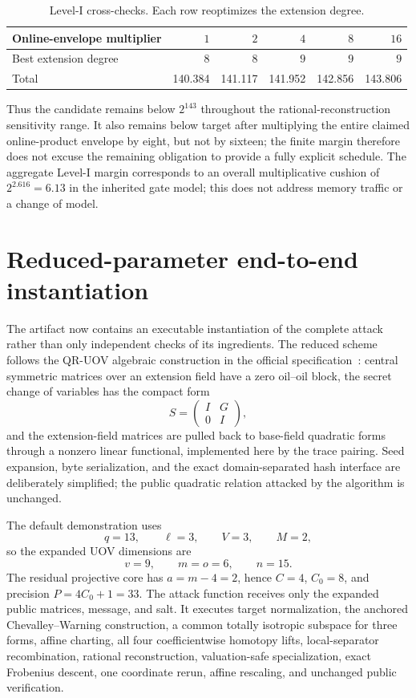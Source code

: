 \documentclass[11pt,a4paper]{article}
\theoremstyle{definition}
\theoremstyle{remark}
\begin{document}
\begin{table}[ht]
\centering
\caption{Level-I cross-checks.  Each row reoptimizes the extension degree.}
\label{tab:robustness}
\begin{tabular}{@{}lrrrrr@{}}
\toprule
Online-envelope multiplier & $1$ & $2$ & $4$ & $8$ & $16$\\
\midrule
Best extension degree & $8$ & $8$ & $9$ & $9$ & $9$\\
Total & 140.384 & 141.117 & 141.952 & 142.856 & 143.806\\
\bottomrule
\end{tabular}
\end{table}

Thus the candidate remains below $2^{143}$ throughout the rational-reconstruction sensitivity range.  It also remains below target after multiplying the entire claimed online-product envelope by eight, but not by sixteen; the finite margin therefore does not excuse the remaining obligation to provide a fully explicit schedule.  The aggregate Level-I margin corresponds to an overall multiplicative cushion of $2^{2.616}=6.13$ in the inherited gate model; this does not address memory traffic or a change of model.


\section{Reduced-parameter end-to-end instantiation}\label{sec:implementation}

The artifact now contains an executable instantiation of the complete attack rather than only independent checks of its ingredients.  The reduced scheme follows the QR-UOV algebraic construction in the official specification~\cite{QRUOVSpec}: central symmetric matrices over an extension field have a zero oil--oil block, the secret change of variables has the compact form
\[
 S=\begin{pmatrix}I&G\\0&I\end{pmatrix},
\]
and the extension-field matrices are pulled back to base-field quadratic forms through a nonzero linear functional, implemented here by the trace pairing.  Seed expansion, byte serialization, and the exact domain-separated hash interface are deliberately simplified; the public quadratic relation attacked by the algorithm is unchanged.

The default demonstration uses
\[
 q=13,\qquad \ell=3,\qquad V=3,\qquad M=2,
\]
so the expanded UOV dimensions are
\[
 v=9,\qquad m=o=6,\qquad n=15.
\]
The residual projective core has $a=m-4=2$, hence $C=4$, $C_0=8$, and precision $P=4C_0+1=33$.  The attack function receives only the expanded public matrices, message, and salt.  It executes target normalization, the anchored Chevalley--Warning construction, a common totally isotropic subspace for three forms, affine charting, all four coefficientwise homotopy lifts, local-separator recombination, rational reconstruction, valuation-safe specialization, exact Frobenius descent, one coordinate rerun, affine rescaling, and unchanged public verification.
\end{document}
